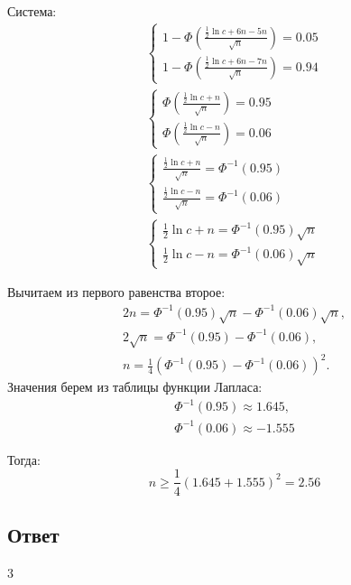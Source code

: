 Система:
\begin{gather}
    \left \{
    \begin{array}{c}
        1 - \Phi \left ( \frac{\frac{1}{2} \ln c + 6 n - 5 n}{\sqrt{n}} \right ) = 0.05 \\
        1 - \Phi \left ( \frac{\frac{1}{2} \ln c + 6 n - 7 n}{\sqrt{n}} \right ) = 0.94
    \end{array}
    \right . \\
    \left \{
    \begin{array}{c}
        \Phi \left ( \frac{\frac{1}{2} \ln c + n}{\sqrt{n}} \right ) = 0.95 \\
        \Phi \left ( \frac{\frac{1}{2} \ln c - n}{\sqrt{n}} \right ) = 0.06
    \end{array}
    \right . \\
    \left \{
    \begin{array}{c}
        \frac{\frac{1}{2} \ln c + n}{\sqrt{n}} = \Phi^{-1}(0.95) \\
        \frac{\frac{1}{2} \ln c - n}{\sqrt{n}} = \Phi^{-1}(0.06)
    \end{array}
    \right . \\
    \left \{
    \begin{array}{c}
        \frac{1}{2} \ln c + n = \Phi^{-1}(0.95) \sqrt{n} \\
        \frac{1}{2} \ln c - n = \Phi^{-1}(0.06) \sqrt{n}
    \end{array}
    \right .
\end{gather}

Вычитаем из первого равенства второе:
\begin{gather}
    2 n = \Phi^{-1}(0.95) \sqrt{n} - \Phi^{-1}(0.06) \sqrt{n} , \\
    2 \sqrt{n} = \Phi^{-1}(0.95) - \Phi^{-1}(0.06) , \\
    n = \frac{1}{4} \left ( \Phi^{-1}(0.95) - \Phi^{-1}(0.06) \right )^2 .
\end{gather}
Значения берем из таблицы функции Лапласа:
\begin{gather}
    \Phi^{-1}(0.95) \approx 1.645 , \\
    \Phi^{-1}(0.06) \approx -1.555
\end{gather}

Тогда:
\begin{equation}
    n \ge \frac{1}{4} ( 1.645 + 1.555 )^2 = 2.56
\end{equation}

\subsection*{Ответ}
3

